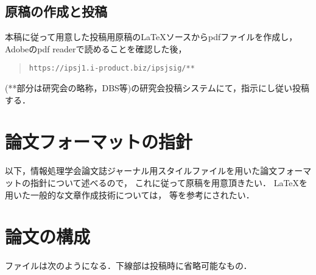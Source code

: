\documentclass[submit,techrep,noauthor]{ipsj}
\def\|{\verb|}
\begin{document}
%2.2
\subsection{原稿の作成と投稿}

本稿に従って用意した投稿用原稿の\LaTeX ソースからpdfファイルを作成し，
Adobeのpdf readerで読めることを確認した後，
\begin{quote}
\small
\|https://ipsj1.i-product.biz/ipsjsig/**|
\end{quote}
(**部分は研究会の略称，DBS等)の研究会投稿システムにて，指示にし従い投稿する．







\section{論文フォーマットの指針}
\label{sec:format}

以下，情報処理学会論文誌ジャーナル用スタイルファイルを用いた論文フォーマットの指針について述べるので，
これに従って原稿を用意頂きたい．
\LaTeX を用いた一般的な文章作成技術については，
\cite{okumura, companion} 等を参考にされたい．



\section{論文の構成}
\label{config}

ファイルは次のようになる．下線部は投稿時に省略可能なもの．
\end{document}
